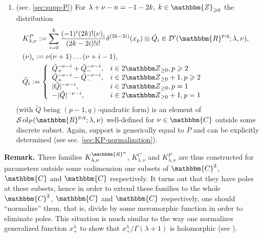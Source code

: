 \documentclass{article}
\newcommand{\assign}{:=}
\newcommand{\tmop}[1]{\ensuremath{\operatorname{#1}}}
\newcommand{\tmtextbf}[1]{{\bfseries{#1}}}
\numberwithin{definition}{section}
\numberwithin{lemma}{section}
\numberwithin{proposition}{section}
{\theorembodyfont{\rmfamily}\newtheorem{remark}{Remark}
\numberwithin{remark}{section}
}
\begin{document}
{\begin{enumerate}
  \item (sec. \ref{sec:supp-P}) For $\lambda + \nu - n = - 1 - 2 k, \; k \in
  \mathbbm{Z}_{\geqslant 0}$ the distribution
  \begin{eqnarray}
    & K^P_{\lambda, \nu} \assign \sum_{i = 0}^k \frac{(- 1)^i (2 k) !
    (\nu)^{}_i}{(2 k - 2 i) !i!} \delta^{(2 k - 2 i)} (x_p) \otimes
    \tilde{Q}_i \in \mathcal{D}' ( \mathbbm{R}^{p, q} ; \lambda, \nu), & 
    \nonumber\\
    & (\nu)^{}_i \assign \nu (\nu + 1) \ldots (\nu + i - 1), &  \nonumber\\
    & \tilde{Q}_i \assign \left\{ \begin{array}{ll}
      \tilde{Q}_+^{- \nu - i} + \tilde{Q}_-^{- \nu - i}, & i \in 2 \Z_{\ge 0},
      p \geqslant 2\\
      \tilde{Q}_+^{- \nu - i} - \tilde{Q}_-^{- \nu - i}, & i \in 2 \Z_{\ge 0}
      + 1, p \geqslant 2\\
      | \tilde{Q} |^{- \nu - i}, & i \in 2 \Z_{\ge 0}, p = 1\\
      - | \tilde{Q} |^{- \nu - i}, & i \in 2 \Z_{\ge 0} + 1, p = 1
    \end{array} \right. &  \nonumber
  \end{eqnarray}
  (with $\tilde{Q}$ being $( p - 1, q)$-quadratic form) is an element of
  $\mathcal{S} \tmop{ol}_P ( \mathbbm{R}^{p, q} ; \lambda, \nu)$ well-defined
  for $\nu \in \mathbbm{C}$ outside some discrete subset. Again, support is
  generically equal to $P$ and can be explicitly determined (see sec.
  \ref{sec:KP-normalization}).
\end{enumerate}}{\hspace*{\fill}}{\medskip}

{\noindent}\tmtextbf{Remark. }Three families $K_{\lambda,
\nu}^{\mathbbm{R}^n}$, $K_{\lambda, \nu}^C$ and $K_{\lambda, \nu}^P$ are thus
constructed for parameters outside some codimension one subsets of
$\mathbbm{C}^2$, $\mathbbm{C}$ and $\mathbbm{C}$ respectively. It turns out
that they have poles at these subsets, hence in order to extend these families
to the whole $\mathbbm{C}^2$, $\mathbbm{C}$ and $\mathbbm{C}$ respectively,
one should ``normalize'' them, that is, divide by some meromorphic function in
order to eliminate poles. This situation is much similar to the way one
normalizes generalized function $x_+^{\lambda}$ to show that $x_+^{\lambda} /
\Gamma ( \lambda + 1)$ is holomorphic (see {\cite[sec.
1.3.5]{gelfand1980distribution}}).{\hspace*{\fill}}{\medskip}
\end{document}
